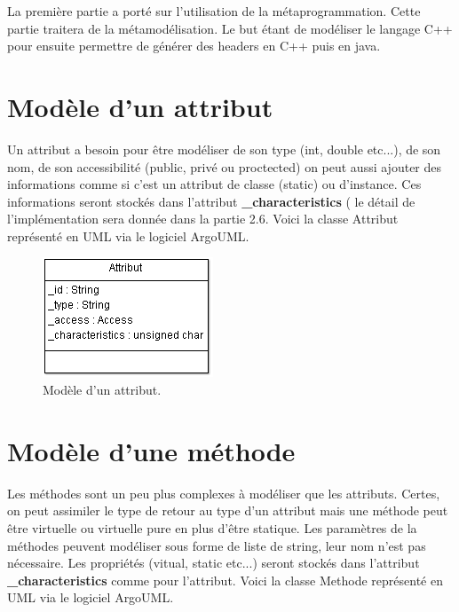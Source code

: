 \documentclass[a4paper,11pt]{report}
\begin{document}
\normalsize{
La première partie a porté sur l'utilisation de la métaprogrammation. Cette partie traitera de la métamodélisation. Le but étant de modéliser le langage C++ pour ensuite permettre de générer des headers en C++ puis en java.
}

\section{Modèle d'un attribut}

\normalsize{
Un attribut a besoin pour être modéliser de son type (int, double etc...), de son nom, de son accessibilité (public, privé ou proctected) on peut aussi ajouter des informations comme si c'est un attribut de classe (static) ou d'instance. Ces informations seront stockés dans l'attribut {\bf \_characteristics} ( le détail de l'implémentation sera donnée dans la partie 2.6. Voici la classe Attribut représenté en UML via le logiciel ArgoUML. \\
}

\begin{figure}[!h]
   \begin{center}
   \includegraphics[scale = 1.0]{ModeleAttribut.PNG}
   \end{center}
  \caption{Modèle d'un attribut.}
\end{figure}


\section{Modèle d'une méthode}

\normalsize{
Les méthodes sont un peu plus complexes à modéliser que les attributs. Certes, on peut assimiler le type de retour au type d'un attribut mais une méthode peut être virtuelle ou virtuelle pure en plus d'être statique. Les paramètres de la méthodes peuvent modéliser sous forme de liste de string, leur nom n'est pas nécessaire. Les propriétés (vitual, static etc...) seront stockés dans l'attribut {\bf \_characteristics} comme pour l'attribut.  Voici la classe Methode représenté en UML via le logiciel ArgoUML. \\
}
\end{document}
